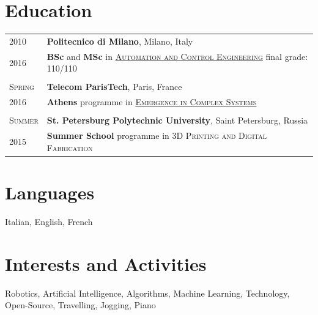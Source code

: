 \documentclass[a4paper,10pt]{article}
\begin{document}
	\section{Education}
		\begin{tabular}{p{1.7cm}|p{14.5cm}}	
			\centering\textsc{2010} & \textbf{Politecnico di Milano}, Milano, Italy\\
			\centering\textsc{2016} & \textbf{BSc} and \textbf{MSc} in \textsc{\href{http://www.polinternational.polimi.it/educational-offer/laurea-magistrale-equivalent-to-master-of-science-programmes/automation-and-control-engineering/}{Automation and Control Engineering}} \hfill final grade: \textsc{110/110} \\ 
			
			\multicolumn{2}{c}{} \\
			\centering\textsc{Spring} & \textbf{Telecom ParisTech}, Paris, France\\
			\centering\textsc{2016}   &  \textbf{Athens} programme in \textsc{\href{http://www.athensprogramme.com/catalog/show/1640}{Emergence in Complex Systems}}\\
			
			\multicolumn{2}{c}{} \\
			\centering\textsc{Summer} & \textbf{St. Petersburg Polytechnic University}, Saint Petersburg, Russia\\
			\centering\textsc{2015}      & \textbf{Summer School} programme in \textsc{3D Printing and Digital Fabrication}\\
		\end{tabular}

	\section{Languages}
	Italian, English, French

	\section{Interests and Activities}
	Robotics, Artificial Intelligence, Algorithms, Machine Learning, Technology, Open-Source, Travelling, Jogging, Piano\\
\end{document}
